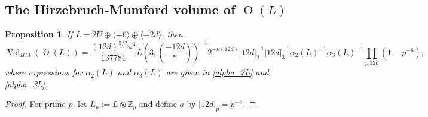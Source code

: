 \documentclass[12pt, a4paper]{article}
\newtheorem{proposition}[thm]{Proposition}
\newcommand{\ZZ}{\mathbb{Z}}
\newcommand{\la}{\langle}
\newcommand{\ra}{\rangle}
\newcommand{\opn}{\operatorname}
\newcommand{\op}{\oplus}
\begin{document}
\subsection{The Hirzebruch-Mumford volume of $\opn{O}(L)$}
\begin{proposition}\label{HMvolOL}
  If $L = 2U \op \la -6 \ra \op \la -2d \ra$, then
  \[
    \opn{Vol}_{HM}(\opn{O}(L))
    =  \frac{(12d)^{5/2}\pi^{3}}{137781} L(3, \left( \frac{-12d}{*} \right) )^{-1} 2^{-\nu(12d)} 
    \vert 12d \vert^{-1}_2 \vert 12 d \vert^{-1}_3 \alpha_2(L)^{-1} \alpha_3(L)^{-1} \prod_{p \vert 12d} (1-p^{-6}),
  \]
  where expressions for $\alpha_2(L)$ and $\alpha_3(L)$ are given in \eqref{alpha_2L} and \eqref{alpha_3L}.
\end{proposition}
\begin{proof}
  For prime $p$, let $L_p:=L \otimes \ZZ_p$ and define $a$ by $\vert 12 d \vert_p = p^{-a}$.
  

\end{proof}
\end{document}
